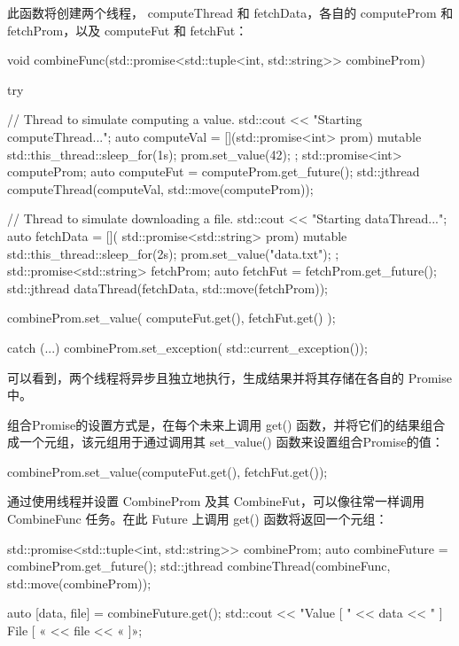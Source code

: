 此函数将创建两个线程， computeThread 和 fetchData，各自的 computeProm 和 fetchProm，以及 computeFut 和 fetchFut：

\begin{cpp}
void combineFunc(std::promise<std::tuple<int,
                 std::string>> combineProm) {
    try {
        // Thread to simulate computing a value.
        std::cout << "Starting computeThread...\n";
        auto computeVal = [](std::promise<int> prom)
                             mutable {
            std::this_thread::sleep_for(1s);
            prom.set_value(42);
        };
        std::promise<int> computeProm;
        auto computeFut = computeProm.get_future();
        std::jthread computeThread(computeVal,
                                std::move(computeProm));

        // Thread to simulate downloading a file.
        std::cout << "Starting dataThread...\n";
        auto fetchData = [](
        std::promise<std::string> prom) mutable {
            std::this_thread::sleep_for(2s);
            prom.set_value("data.txt");
        };
        std::promise<std::string> fetchProm;
        auto fetchFut = fetchProm.get_future();
        std::jthread dataThread(fetchData,
                                std::move(fetchProm));

        combineProm.set_value({
            computeFut.get(),
            fetchFut.get()
        });
    } catch (...) {
        combineProm.set_exception(
                    std::current_exception());
    }
}
\end{cpp}

可以看到，两个线程将异步且独立地执行，生成结果并将其存储在各自的 Promise 中。

组合Promise的设置方式是，在每个未来上调用 get() 函数，并将它们的结果组合成一个元组，该元组用于通过调用其 set\_value() 函数来设置组合Promise的值：

\begin{cpp}
combineProm.set_value({computeFut.get(), fetchFut.get()});
\end{cpp}

通过使用线程并设置 CombineProm 及其 CombineFut，可以像往常一样调用 CombineFunc 任务。在此 Future 上调用 get() 函数将返回一个元组：

\begin{cpp}
std::promise<std::tuple<int, std::string>> combineProm;
auto combineFuture = combineProm.get_future();
std::jthread combineThread(combineFunc,
                           std::move(combineProm));

auto [data, file] = combineFuture.get();
std::cout << "Value [ " << data
          << " ] File [ « << file << « ]\n»;
\end{cpp}

